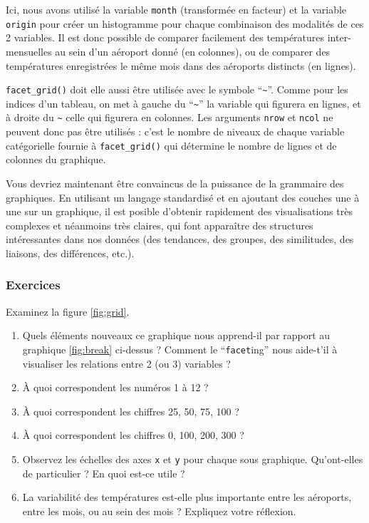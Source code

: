 \documentclass[a4paperpaper,]{article}
\providecommand{\tightlist}{%
  \setlength{\itemsep}{0pt}\setlength{\parskip}{0pt}}
\begin{document}
Ici, nous avons utilisé la variable \texttt{month} (transformée en facteur) et la variable \texttt{origin} pour créer un histogramme pour chaque combinaison des modalités de ces 2 variables. Il est donc possible de comparer facilement des températures inter-mensuelles au sein d'un aéroport donné (en colonnes), ou de comparer des températures enregistrées le même mois dans des aéroports distincts (en lignes).

\texttt{facet\_grid()} doit elle aussi être utilisée avec le symbole ``\texttt{\textasciitilde{}}''. Comme pour les indices d'un tableau, on met à gauche du ``\texttt{\textasciitilde{}}'' la variable qui figurera en lignes, et à droite du \texttt{\textasciitilde{}} celle qui figurera en colonnes. Les arguments \texttt{nrow} et \texttt{ncol} ne peuvent donc pas être utilisés : c'est le nombre de niveaux de chaque variable catégorielle fournie à \texttt{facet\_grid()} qui détermine le nombre de lignes et de colonnes du graphique.

Vous devriez maintenant être convaincus de la puissance de la grammaire des graphiques. En utilisant un langage standardisé et en ajoutant des couches une à une sur un graphique, il est posible d'obtenir rapidement des visualisations très complexes et néanmoins très claires, qui font apparaître des structures intéressantes dans nos données (des tendances, des groupes, des similitudes, des liaisons, des différences, etc.).

\hypertarget{exercices-4}{%
\subsubsection{Exercices}\label{exercices-4}}

Examinez la figure \ref{fig:grid}.

\begin{enumerate}
\def\labelenumi{\arabic{enumi}.}
\tightlist
\item
  Quels éléments nouveaux ce graphique nous apprend-il par rapport au graphique \ref{fig:break} ci-dessus ? Comment le ``\texttt{facet}ing'' nous aide-t'il à visualiser les relations entre 2 (ou 3) variables ?
\item
  À quoi correspondent les numéros 1 à 12 ?
\item
  À quoi correspondent les chiffres 25, 50, 75, 100 ?
\item
  À quoi correspondent les chiffres 0, 100, 200, 300 ?
\item
  Observez les échelles des axes \texttt{x} et \texttt{y} pour chaque sous graphique. Qu'ont-elles de particulier ? En quoi est-ce utile ?
\item
  La variabilité des températures est-elle plus importante entre les aéroports, entre les mois, ou au sein des mois ? Expliquez votre réflexion.
\end{enumerate}
\end{document}
